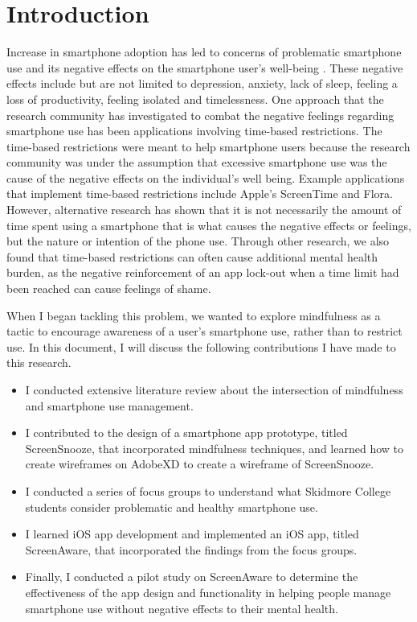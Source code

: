 \documentclass[12pt, title page, manuscript, nonacm]{acmart}
\begin{document}
\section*{Introduction}
Increase in smartphone adoption has led to concerns of problematic smartphone use and its negative effects on the smartphone user’s well-being \cite{lukoff2018makes, elhai2017problematic, babic2017longitudinal, elhai2017typeqs, wang2015role}. These negative effects include but are not limited to depression, anxiety, lack of sleep, feeling a loss of productivity, feeling isolated and timelessness\cite{kliesener2022associations, elhai2017non, tran2019modeling}. One approach that the research community has investigated to combat the negative feelings regarding smartphone use has been applications involving time-based restrictions. The time-based restrictions were meant to help smartphone users because the research community was under the assumption that excessive smartphone use was the cause of the negative effects on the individual's well being. Example applications that implement time-based restrictions include Apple's ScreenTime and Flora\cite{flora}. However, alternative research has shown that it is not necessarily the amount of time spent using a smartphone that is what causes the negative effects or feelings, but the nature or intention of the phone use\cite{human14:connected}. Through other research, we also found that time-based restrictions can often cause additional mental health burden, as the negative reinforcement of an app lock-out when a time limit had been reached can cause feelings of shame\cite{warnings20}. \par When I began tackling this problem, we wanted to explore mindfulness as a tactic to encourage awareness of a user's smartphone use, rather than to restrict use. In this document, I will discuss the following contributions I have made to this research.
\begin{itemize}
    \item I conducted extensive literature review about the intersection of mindfulness and smartphone use management.
    \item I contributed to the design of a smartphone app prototype, titled ScreenSnooze, that incorporated mindfulness techniques, and learned how to create wireframes on AdobeXD to create a wireframe of ScreenSnooze.
    \item I conducted a series of focus groups to understand what Skidmore College students consider problematic and healthy smartphone use.
    \item I learned iOS app development and implemented an iOS app, titled ScreenAware, that incorporated the findings from the focus groups.
    \item Finally, I conducted a pilot study on ScreenAware to determine the effectiveness of the app design and functionality in helping people manage smartphone use without negative effects to their mental health.
\end{itemize}
\end{document}
